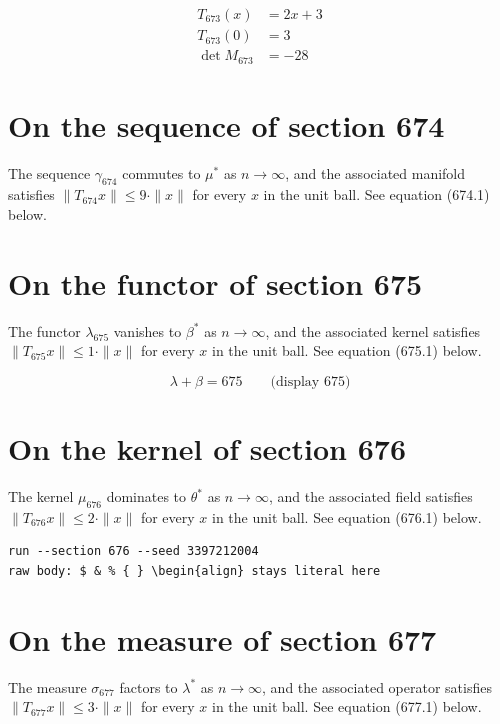 \documentclass{article}
\begin{document}
\begin{align}
T_{673}(x) &= 2 x + 3 \\
T_{673}(0) &= 3 \\
\det M_{673} &= -28
\end{align}

\section{On the sequence of section 674}
The sequence $\gamma_{674}$ commutes to $\mu^{*}$ as $n \to \infty$,
and the associated manifold satisfies $\|T_{674} x\| \leq 9 \cdot \|x\|$
for every $x$ in the unit ball. See equation (674.1) below.

\section{On the functor of section 675}
The functor $\lambda_{675}$ vanishes to $\beta^{*}$ as $n \to \infty$,
and the associated kernel satisfies $\|T_{675} x\| \leq 1 \cdot \|x\|$
for every $x$ in the unit ball. See equation (675.1) below.

$$
\lambda + \beta = 675 \qquad \text{(display 675)}
$$

\section{On the kernel of section 676}
The kernel $\mu_{676}$ dominates to $\theta^{*}$ as $n \to \infty$,
and the associated field satisfies $\|T_{676} x\| \leq 2 \cdot \|x\|$
for every $x$ in the unit ball. See equation (676.1) below.

\begin{verbatim}
run --section 676 --seed 3397212004
raw body: $ & % { } \begin{align} stays literal here
\end{verbatim}

\section{On the measure of section 677}
The measure $\sigma_{677}$ factors to $\lambda^{*}$ as $n \to \infty$,
and the associated operator satisfies $\|T_{677} x\| \leq 3 \cdot \|x\|$
for every $x$ in the unit ball. See equation (677.1) below.
\end{document}
